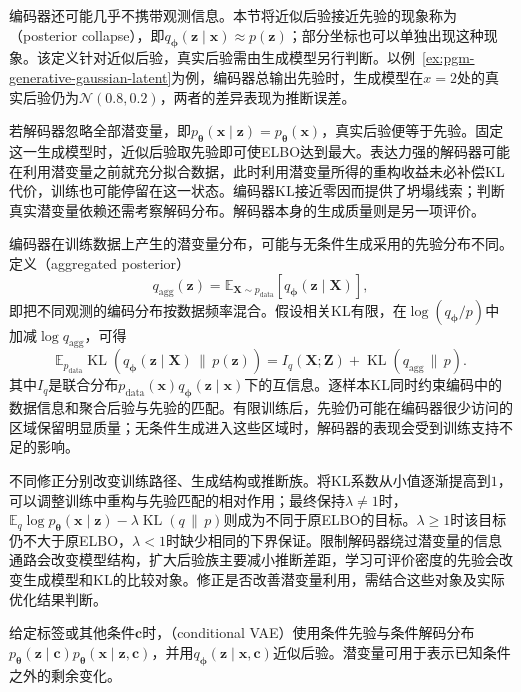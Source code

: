 编码器还可能几乎不携带观测信息。本节将近似后验接近先验的现象称为（posterior collapse），即$q_{\bm{\phi}}(\bm{z}\mid\bm{x})\approx p(\bm{z})$；部分坐标也可以单独出现这种现象。该定义针对近似后验，真实后验需由生成模型另行判断。以例~\ref{ex:pgm-generative-gaussian-latent}为例，编码器总输出先验时，生成模型在$x=2$处的真实后验仍为$\mathcal{N}(0.8,0.2)$，两者的差异表现为推断误差。

若解码器忽略全部潜变量，即$p_{\bm{\theta}}(\bm{x}\mid\bm{z})=p_{\bm{\theta}}(\bm{x})$，真实后验便等于先验。固定这一生成模型时，近似后验取先验即可使ELBO达到最大。表达力强的解码器可能在利用潜变量之前就充分拟合数据，此时利用潜变量所得的重构收益未必补偿KL代价，训练也可能停留在这一状态。编码器KL接近零因而提供了坍塌线索；判断真实潜变量依赖还需考察解码分布。解码器本身的生成质量则是另一项评价。

编码器在训练数据上产生的潜变量分布，可能与无条件生成采用的先验分布不同。定义（aggregated posterior）
\begin{equation}
  \label{eq:pgm-generative-aggregated-posterior}
  q_{\mathrm{agg}}(\bm{z})
  =\mathbb{E}_{\bm{X}\sim p_{\mathrm{data}}}
       [q_{\bm{\phi}}(\bm{z}\mid\bm{X})],
\end{equation}
即把不同观测的编码分布按数据频率混合。假设相关KL有限，在$\log(q_{\bm{\phi}}/p)$中加减$\log q_{\mathrm{agg}}$，可得
\begin{equation}
  \label{eq:pgm-generative-kl-information}
  \mathbb{E}_{p_{\mathrm{data}}}
    \operatorname{KL}(q_{\bm{\phi}}(\bm{z}\mid\bm{X})\,\|\,p(\bm{z}))
  =I_q(\bm{X};\bm{Z})+
    \operatorname{KL}(q_{\mathrm{agg}}\,\|\,p).
\end{equation}
其中$I_q$是联合分布$p_{\mathrm{data}}(\bm{x})q_{\bm{\phi}}(\bm{z}\mid\bm{x})$下的互信息。逐样本KL同时约束编码中的数据信息和聚合后验与先验的匹配。有限训练后，先验仍可能在编码器很少访问的区域保留明显质量；无条件生成进入这些区域时，解码器的表现会受到训练支持不足的影响。

不同修正分别改变训练路径、生成结构或推断族。将KL系数从小值逐渐提高到$1$，可以调整训练中重构与先验匹配的相对作用；最终保持$\lambda\ne1$时，$\mathbb{E}_q\log p_{\bm{\theta}}(\bm{x}\mid\bm{z})-\lambda \operatorname{KL}(q\,\|\,p)$则成为不同于原ELBO的目标。$\lambda\geq1$时该目标仍不大于原ELBO，$\lambda<1$时缺少相同的下界保证。限制解码器绕过潜变量的信息通路会改变模型结构，扩大后验族主要减小推断差距，学习可评价密度的先验会改变生成模型和KL的比较对象。修正是否改善潜变量利用，需结合这些对象及实际优化结果判断。

给定标签或其他条件$\bm{c}$时，（conditional VAE）使用条件先验与条件解码分布$p_{\bm{\theta}}(\bm{z}\mid\bm{c})p_{\bm{\theta}}(\bm{x}\mid\bm{z},\bm{c})$，并用$q_{\bm{\phi}}(\bm{z}\mid\bm{x},\bm{c})$近似后验。潜变量可用于表示已知条件之外的剩余变化。

